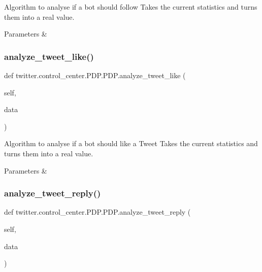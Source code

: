 Algorithm to analyse if a bot should follow Takes the current statistics and turns them into a real value. 


\begin{DoxyParams}{Parameters}
{\em } & \\
\hline
\end{DoxyParams}
\mbox{\label{classtwitter_1_1control__center_1_1PDP_1_1PDP_af6e05300883ddb19bcd9c6047e000ec1}} 
\subsubsection{\texorpdfstring{analyze\+\_\+tweet\+\_\+like()}{analyze\_tweet\_like()}}
{\footnotesize\ttfamily def twitter.\+control\+\_\+center.\+P\+D\+P.\+P\+D\+P.\+analyze\+\_\+tweet\+\_\+like (\begin{DoxyParamCaption}\item[{}]{self,  }\item[{}]{data }\end{DoxyParamCaption})}



Algorithm to analyse if a bot should like a Tweet Takes the current statistics and turns them into a real value. 


\begin{DoxyParams}{Parameters}
{\em } & \\
\hline
\end{DoxyParams}
\mbox{\label{classtwitter_1_1control__center_1_1PDP_1_1PDP_acbac2033b2853b89b3ee19ed040586e8}} 
\subsubsection{\texorpdfstring{analyze\+\_\+tweet\+\_\+reply()}{analyze\_tweet\_reply()}}
{\footnotesize\ttfamily def twitter.\+control\+\_\+center.\+P\+D\+P.\+P\+D\+P.\+analyze\+\_\+tweet\+\_\+reply (\begin{DoxyParamCaption}\item[{}]{self,  }\item[{}]{data }\end{DoxyParamCaption})}



